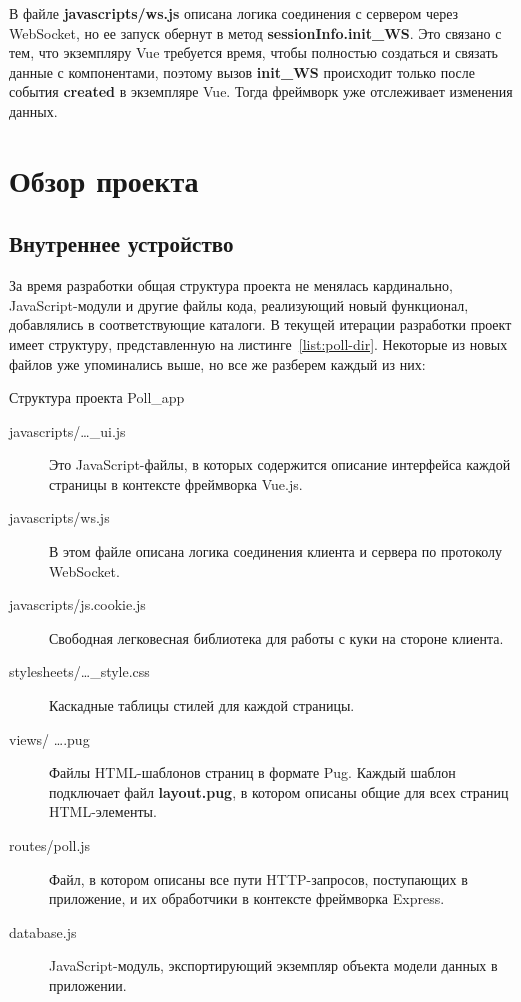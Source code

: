 В файле \textbf{javascripts/ws.js} описана логика соединения с сервером через WebSocket, но ее запуск обернут в метод  
\textbf{sessionInfo.init\_WS}. Это связано с тем, что экземпляру Vue требуется время, чтобы полностью создаться и связать данные с компонентами, поэтому вызов \textbf{init\_WS} происходит только после события \textbf{created} в экземпляре Vue. Тогда фреймворк уже отслеживает изменения данных.     

\section{Обзор проекта}
\subsection{Внутреннее устройство}
За время разработки общая структура проекта не менялась кардинально, JavaScript-модули и другие файлы кода, реализующий новый функционал, добавлялись в соответствующие каталоги. В текущей итерации разработки проект имеет структуру, представленную на листинге~\ref{list:poll-dir}. Некоторые из новых файлов уже упоминались выше, но все же разберем каждый из них:

\begin{ListingEnv}[p]
\caption{Структура проекта Poll\_app}
\label{list:poll-dir}
\end{ListingEnv}
\begin{description}
	\item[javascripts/\dots\_ui.js] Это JavaScript-файлы, в которых содержится описание интерфейса каждой страницы в контексте фреймворка Vue.js. 
	\item[javascripts/ws.js] В этом файле описана логика соединения клиента и сервера по протоколу WebSocket.
	\item[javascripts/js.cookie.js] Свободная легковесная библиотека для работы с куки на стороне клиента.
	\item[stylesheets/\dots\_style.css] Каскадные таблицы стилей для каждой страницы.
	\item[views/ \dots\space.pug] Файлы HTML-шаблонов страниц в формате Pug. Каждый шаблон подключает файл \textbf{layout.pug}, в котором описаны общие для всех страниц HTML-элементы. 
	\item[routes/poll.js] Файл, в котором описаны все пути HTTP-запросов, поступающих в приложение, и их обработчики в контексте фреймворка Express.
	\item[database.js] JavaScript-модуль, экспортирующий экземпляр объекта модели данных в приложении.  
\end{description}

